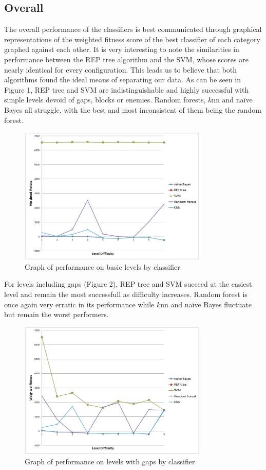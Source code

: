 \documentclass[]{article}   %
\begin{document}
\subsection{Overall}

The overall performance of the classifiers is best communicated through graphical representations of the weighted fitness score of the best classifier
of each category graphed against each other. It is very interesting to note the similarities in performance between the REP tree algorithm and the SVM,
whose scores are nearly identical for every configuration. This leads us to believe that both algorithms found the ideal means of separating our data.
\newline\newline
As can be seen in Figure 1, REP tree and SVM are indistinguishable and highly successful with simple levels devoid of gaps, blocks or enemies. Random
forests, $k$nn and na\"{i}ve Bayes all struggle, with the best and most inconsistent of them being the random forest.
\begin{figure}[H]
\centering
\includegraphics[width=90mm]{basic.png}
\caption{Graph of performance on basic levels by classifier}
\end{figure}

For levels including gaps (Figure 2), REP tree and SVM succeed at the easiest level and remain the most successfull as difficulty increases. Random forest is once again
very erratic in its performance while $k$nn and na\"{i}ve Bayes fluctuate but remain the worst performers.
\begin{figure}[H]
\centering
\includegraphics[width=90mm]{gaps.png}
\caption{Graph of performance on levels with gaps by classifier}
\end{figure}
\end{document}

